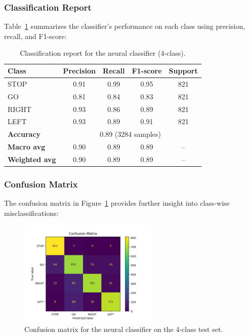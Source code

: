 \subsubsection*{Classification Report}

Table~\ref{tab:classification_report} summarizes the classifier's performance on each class using precision, recall, and F1-score:

\begin{table}[h]
\centering
\begin{tabular}{lcccc}
\toprule
\textbf{Class} & \textbf{Precision} & \textbf{Recall} & \textbf{F1-score} & \textbf{Support} \\
\midrule
STOP  & 0.91 & 0.99 & 0.95 & 821 \\
GO    & 0.81 & 0.84 & 0.83 & 821 \\
RIGHT & 0.93 & 0.86 & 0.89 & 821 \\
LEFT  & 0.93 & 0.89 & 0.91 & 821 \\
\midrule
\textbf{Accuracy} & \multicolumn{4}{c}{0.89 (3284 samples)} \\
\textbf{Macro avg} & 0.90 & 0.89 & 0.89 & -- \\
\textbf{Weighted avg} & 0.90 & 0.89 & 0.89 & -- \\
\bottomrule
\end{tabular}
\caption{Classification report for the neural classifier (4-class).}
\label{tab:classification_report}
\end{table}

\subsubsection*{Confusion Matrix}

The confusion matrix in Figure~\ref{fig:conf_matrix} provides further insight into class-wise misclassifications:

\begin{figure}[h]
    \centering
    \includegraphics[width=0.6\textwidth]{img/classifier/confusion_matrix_4_classes.png}
    \caption{Confusion matrix for the neural classifier on the 4-class test set.}
    \label{fig:conf_matrix}
\end{figure}

